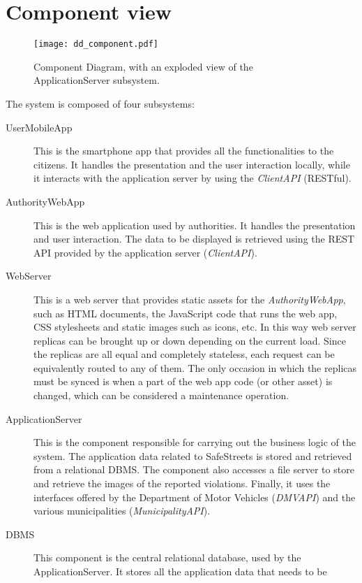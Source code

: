 \section{Component view}
\label{sec:component_view}
\begin{figure}[ht]
    \centering
    \texttt{[image: dd\_component.pdf]}
    \caption{Component Diagram, with an exploded view of the ApplicationServer
    subsystem.}
    \label{fig:component_diagram}
\end{figure}
\noindent
The system is composed of four subsystems:
\begin{description}
    \item[UserMobileApp] This is the smartphone app that provides all the
    functionalities to the citizens. It handles the presentation and the user
    interaction locally, while it interacts with the application server
    by using the \emph{ClientAPI} (RESTful).
    \item[AuthorityWebApp] This is the web application used by authorities.
    It handles the presentation and user interaction. The data to be displayed
    is retrieved using the REST API provided by the application server
    (\emph{ClientAPI}).
    \item[WebServer] This is a web server that provides static assets for the
    \emph{AuthorityWebApp}, such as HTML documents, the JavaScript code that
    runs the web app, CSS stylesheets and static images such as icons, etc.
    In this way web server replicas can be brought up or down depending on the
    current load. Since the replicas are all equal and completely stateless,
    each request can be equivalently routed to any of them.
    The only occasion in which the replicas must be synced is when a part of
    the web app code (or other asset) is changed, which can be considered a
    maintenance operation.
    \item[ApplicationServer] This is the component responsible for carrying
    out the business logic of the system. The application data related to
    SafeStreets is stored and retrieved from a relational DBMS.
    The component also accesses a file server to store and retrieve the images
    of the reported violations.
    Finally, it uses the interfaces offered by the Department of Motor Vehicles
    (\emph{DMVAPI}) and the various municipalities (\emph{MunicipalityAPI}).
    \item[DBMS] This component is the central relational database, used by the
    ApplicationServer. It stores all the application data that needs to be

\end{description}
